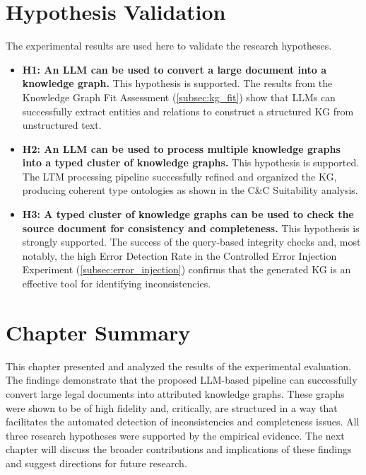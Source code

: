 \section{Hypothesis Validation}
\label{sec:hypothesis_validation}
The experimental results are used here to validate the research hypotheses.
\begin{itemize}
    \item \textbf{H1: An LLM can be used to convert a large document into a knowledge graph.} This hypothesis is supported. The results from the Knowledge Graph Fit Assessment (\cref{subsec:kg_fit}) show that LLMs can successfully extract entities and relations to construct a structured KG from unstructured text.
    \item \textbf{H2: An LLM can be used to process multiple knowledge graphs into a typed cluster of knowledge graphs.} This hypothesis is supported. The LTM processing pipeline successfully refined and organized the KG, producing coherent type ontologies as shown in the C\&C Suitability analysis.
    \item \textbf{H3: A typed cluster of knowledge graphs can be used to check the source document for consistency and completeness.} This hypothesis is strongly supported. The success of the query-based integrity checks and, most notably, the high Error Detection Rate in the Controlled Error Injection Experiment (\cref{subsec:error_injection}) confirms that the generated KG is an effective tool for identifying inconsistencies.
\end{itemize}

\section{Chapter Summary}
\label{sec:results_summary}
This chapter presented and analyzed the results of the experimental evaluation. The findings demonstrate that the proposed LLM-based pipeline can successfully convert large legal documents into attributed knowledge graphs. These graphs were shown to be of high fidelity and, critically, are structured in a way that facilitates the automated detection of inconsistencies and completeness issues. All three research hypotheses were supported by the empirical evidence. The next chapter will discuss the broader contributions and implications of these findings and suggest directions for future research.

